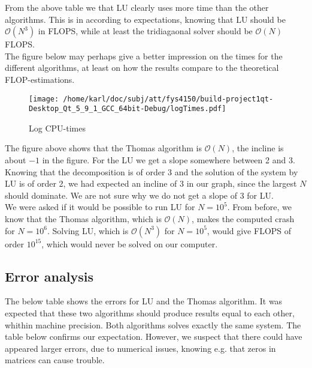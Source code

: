 \documentclass{article}
\begin{document}
From the above table we that LU clearly uses more time than the other algorithms. This is in according to expectations, knowing that LU should be $\mathcal{O}(N^3)$ in FLOPS, while at least the tridiagaonal solver should be $\mathcal{O}(N)$ FLOPS.\\

The figure below may perhaps give a better impression on the times for the different algorithms, at least on how the results compare to the theoretical FLOP-estimations.

\begin{figure}[H]
	\centering
	\texttt{[image: /home/karl/doc/subj/att/fys4150/build-project1qt-Desktop\_Qt\_5\_9\_1\_GCC\_64bit-Debug/logTimes.pdf]}
	\caption{Log CPU-times}
\end{figure}

The figure above shows that the Thomas algorithm is $\mathcal{O}(N)$, the incline is about $-1$ in the figure. For the LU we get a slope somewhere between 2 and 3. Knowing that the decomposition is of order 3 and the solution of the system by LU is of order 2, we had expected an incline of 3 in our graph, since the largest $N$ should dominate. We are not sure why we do not get a slope of 3 for LU. \\

We were asked if it would be possible to run LU for $N=10^5.$ From before, we know that the Thomas algorithm, which is $\mathcal{O}(N)$, makes the computed crash for $N = 10^6$. Solving LU, which is $\mathcal{O}(N^3)$ for $N = 10^5$, would give FLOPS of order $10^15$, which would never be solved on our computer.

\subsection{Error analysis}
The below table shows the errors for LU and the Thomas algorithm. It was expected that these two algorithms should produce results equal to each other, whithin machine precision. Both algorithms solves exactly the same system. The table below confirms our expectation. However, we suspect that there could have appeared larger errors, due to numerical issues, knowing e.g. that zeros in matrices can cause trouble.

\begin{minipage}{.49\textwidth} %
	
\end{minipage}\hfill
\begin{minipage}{.49\textwidth}
	
\end{minipage}\hfill
\end{document}
